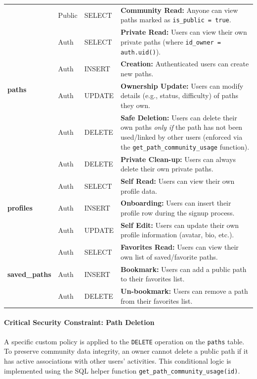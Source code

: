 \begin{small}
\begin{longtable}{|p{}|p{}|p{}|p{}|}
\multirow{6}{*}{\textbf{paths}} 
& Public & SELECT & \textbf{Community Read:} Anyone can view paths marked as \texttt{is\_public = true}. \\
& Auth & SELECT & \textbf{Private Read:} Users can view their own private paths (where \texttt{id\_owner = auth.uid()}). \\
& Auth & INSERT & \textbf{Creation:} Authenticated users can create new paths. \\
& Auth & UPDATE & \textbf{Ownership Update:} Users can modify details (e.g., status, difficulty) of paths they own. \\
& Auth & DELETE & \textbf{Safe Deletion:} Users can delete their own paths \textit{only if} the path has not been used/linked by other users (enforced via the \texttt{get\_path\_community\_usage} function). \\
& Auth & DELETE & \textbf{Private Clean-up:} Users can always delete their own private paths. \\
\hline

\multirow{3}{*}{\textbf{profiles}} 
& Auth & SELECT & \textbf{Self Read:} Users can view their own profile data. \\
& Auth & INSERT & \textbf{Onboarding:} Users can insert their profile row during the signup process. \\
& Auth & UPDATE & \textbf{Self Edit:} Users can update their own profile information (avatar, bio, etc.). \\ 
\hline

\multirow{3}{*}{\textbf{saved\_paths}} 
& Auth & SELECT & \textbf{Favorites Read:} Users can view their own list of saved/favorite paths. \\
& Auth & INSERT & \textbf{Bookmark:} Users can add a public path to their favorites list. \\
& Auth & DELETE & \textbf{Un-bookmark:} Users can remove a path from their favorites list. \\ 

\end{longtable}
\end{small}

\paragraph{Critical Security Constraint: Path Deletion}
A specific custom policy is applied to the \texttt{DELETE} operation on the \texttt{paths} table. To preserve community data integrity, an owner cannot delete a public path if it has active associations with other users' activities. This conditional logic is implemented using the SQL helper function \texttt{get\_path\_community\_usage(id)}.

